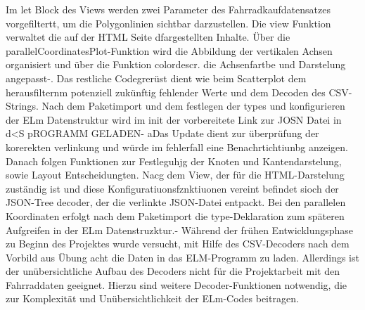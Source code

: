 \documentclass[usegeometry=true]{scrartcl}
\begin{document}
Im let Block des Views werden zwei Parameter des Fahrradkaufdatensatzes vorgefiltertt, um die Polygonlinien sichtbar darzustellen. Die view Funktion verwaltet die auf der HTML Seite dfargestellten Inhalte. Über die parallelCoordinatesPlot-Funktion wird die Abbildung der vertikalen Achsen organisiert und über die Funktion colordescr. die Achsenfartbe und Darstelung angepasst-. Das restliche Codegrerüst dient wie beim Scatterplot dem herausfilternm potenziell zukünftig fehlender Werte und dem Decoden des CSV-Strings. 
Nach dem Paketimport und dem festlegen der types und konfigurieren der ELm Datenstruktur wird im init der vorbereitete Link zur JOSN Datei in d<S pROGRAMM GELADEN- aDas Update dient zur überprüfung der korerekten verlinkung und würde im fehlerfall eine Benachrtichtiunbg anzeigen. Danach folgen Funktionen zur Festleguhjg der Knoten und Kantendarstelung, sowie Layout Entscheidungten. Nacg dem View, der für die HTML-Darstelung zuständig ist und diese Konfiguratiuonsfznktiuonen vereint befindet sioch der JSON-Tree decoder, der die verlinkte JSON-Datei entpackt. 
Bei den parallelen Koordinaten erfolgt nach dem Paketimport die type-Deklaration zum späteren Aufgreifen in der ELm Datenstruzktur.- 
Während der frühen Entwicklungsphase zu Beginn des Projektes wurde versucht, mit Hilfe des CSV-Decoders nach dem Vorbild aus Übung acht die Daten in das ELM-Programm zu laden. Allerdings ist der unübersichtliche Aufbau des Decoders nicht für die Projektarbeit mit den Fahrraddaten geeignet. Hierzu sind weitere Decoder-Funktionen notwendig, die zur Komplexität und Unübersichtlichkeit der ELm-Codes beitragen.
\end{document}
